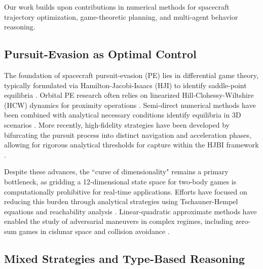 Our work builds upon contributions in numerical methods for spacecraft trajectory optimization, game-theoretic planning, and multi-agent behavior reasoning. 


\subsection{Pursuit-Evasion as Optimal Control}

The foundation of spacecraft pursuit-evasion (PE) lies in differential game theory, typically formulated via Hamilton-Jacobi-Isaacs (HJI) to identify saddle-point equilibria \cite{bacsar1998dynamic}. Orbital PE research often relies on linearized Hill-Clohessy-Wiltshire (HCW) dynamics for proximity operations \cite{stupik2012optimal} \cite{innocentiGameTheoreticStrategies2016} \cite{liDimensionreductionSolutionFreetime2019}. Semi-direct numerical methods have been combined with analytical necessary conditions identify equilibria in 3D scenarios \cite{pontani2009numerical}. More recently, high-fidelity strategies have been developed by bifurcating the pursuit process into distinct navigation and acceleration phases, allowing for rigorous analytical thresholds for capture within the HJBI framework \cite{chen_equilibrium_2024}.

Despite these advances, the ``curse of dimensionality" remains a primary bottleneck, as gridding a 12-dimensional state space for two-body games is computationally prohibitive for real-time applications. Efforts have focused on reducing this burden through analytical strategies using Tschauner-Hempel equations \cite{fu_analytical_2025} and reachability analysis \cite{jia_approximate_2025} \cite{venigalla20193}. Linear-quadratic approximate methods have enabled the study of adversarial maneuvers in complex regimes, including zero-sum games in cislunar space \cite{fotiadis_adversarial_2025} and collision avoidance \cite{venigallaCooperativeNonCooperativeApproaches2022}. 


\subsection{Mixed Strategies and Type-Based Reasoning}

